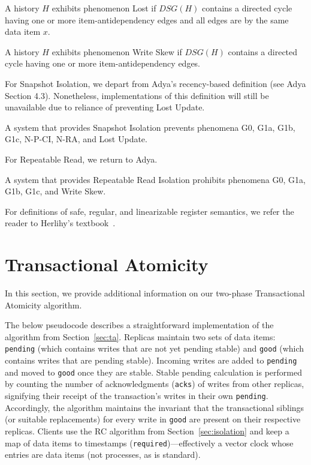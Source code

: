 \begin{definition}
A history $H$ exhibits phenomenon Lost if $DSG(H)$ contains a directed
cycle having one or more item-antidependency edges and all edges are
by the same data item $x$.
\label{def:lostupdate}
\end{definition}

\begin{definition}
A history $H$ exhibits phenomenon Write Skew if $DSG(H)$ contains a directed
cycle having one or more item-antidependency edges.
\end{definition}

For Snapshot Isolation, we depart from Adya's recency-based definition
(see Adya Section 4.3). Nonetheless, implementations of this
definition will still be unavailable due to reliance of preventing
Lost Update.

\begin{definition}
A system that provides Snapshot Isolation prevents phenomena G0, G1a,
G1b, G1c, N-P-CI, N-RA, and Lost Update.
\end{definition}

For Repeatable Read, we return to Adya.

\begin{definition}
A system that provides Repeatable Read Isolation prohibits phenomena
G0, G1a, G1b, G1c, and Write Skew.
\end{definition}

For definitions of safe, regular, and linearizable register semantics,
we refer the reader to Herlihy's textbook~\cite{herlihy-art}.

\section{Transactional Atomicity}

In this section, we provide additional information on our two-phase
Transactional Atomicity algorithm.

The below pseudocode describes a straightforward implementation of the
algorithm from Section~\ref{sec:ta}. Replicas maintain two sets of
data items: \texttt{pending} (which contains writes that are not yet
pending stable) and \texttt{good} (which contains writes that are
pending stable). Incoming writes are added to \texttt{pending} and
moved to \texttt{good} once they are stable. Stable pending
calculation is performed by counting the number of acknowledgments
(\texttt{acks}) of writes from other replicas, signifying their
receipt of the transaction's writes in their
own \texttt{pending}. Accordingly, the algorithm maintains the
invariant that the transactional siblings (or suitable replacements)
for every write in \texttt{good} are present on their respective
replicas. Clients use the RC algorithm from
Section~\ref{sec:isolation} and keep a map of data items to timestamps
(\texttt{required})---effectively a vector clock whose entries are
data items (not processes, as is standard).

